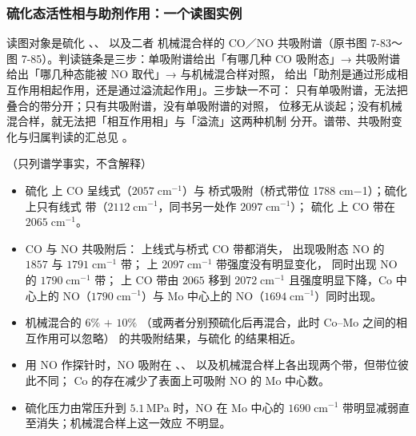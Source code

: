 \subsubsection{硫化态活性相与助剂作用：一个读图实例}

\begin{dataflow}
读图对象是硫化 、、 以及二者
机械混合样的 CO／NO 共吸附谱（原书图 7-83～图 7-85）。判读链条是三步：单吸附谱给出「有哪几种
CO 吸附态」→ 共吸附谱给出「哪几种态能被 NO 取代」→ 与机械混合样对照，
给出「助剂是通过形成相互作用相起作用，还是通过溢流起作用」。三步缺一不可：
只有单吸附谱，无法把叠合的带分开；只有共吸附谱，没有单吸附谱的对照，
位移无从谈起；没有机械混合样，就无法把「相互作用相」与「溢流」这两种机制
分开。谱带、共吸附变化与归属判读的汇总见 。
\end{dataflow}

\begin{obs}
（只列谱学事实，不含解释）
\begin{itemize}
  \item[(a)] 硫化  上 CO 呈线式（$2057\;\mathrm{cm^{-1}}$）与
        桥式吸附（桥式带位 1788 cm−1）；硫化  上只有线式
        带（$2112\;\mathrm{cm^{-1}}$，同书另一处作 $2097\;\mathrm{cm^{-1}}$）；
        硫化  上 CO 带在 $2065\;\mathrm{cm^{-1}}$。
  \item[(b)] CO 与 NO 共吸附后： 上线式与桥式 CO 带都消失，
        出现吸附态 NO 的 $1857$ 与 $1791\;\mathrm{cm^{-1}}$ 带；
         上 $2097\;\mathrm{cm^{-1}}$ 带强度没有明显变化，
        同时出现 NO 的 $1790\;\mathrm{cm^{-1}}$ 带； 上 CO
        带由 $2065$ 移到 $2072\;\mathrm{cm^{-1}}$ 且强度明显下降，Co 中心上的
        NO（$1790\;\mathrm{cm^{-1}}$）与 Mo 中心上的 NO（$1694\;
        \mathrm{cm^{-1}}$）同时出现。
  \item[(c)] 机械混合的 $6\%$  $+$ $10\%$ 
        （或两者分别预硫化后再混合，此时 Co--Mo 之间的相互作用可以忽略）
        的共吸附结果，与硫化  的结果相近。
  \item[(d)] 用 NO 作探针时，NO 吸附在 、、
         以及机械混合样上各出现两个带，但带位彼此不同；
        Co 的存在减少了表面上可吸附 NO 的 Mo 中心数。
  \item[(e)] 硫化压力由常压升到 $5.1$\,MPa 时，NO 在 Mo 中心的
        $1690\;\mathrm{cm^{-1}}$ 带明显减弱直至消失；机械混合样上这一效应
        不明显。
\end{itemize}
\end{obs}

